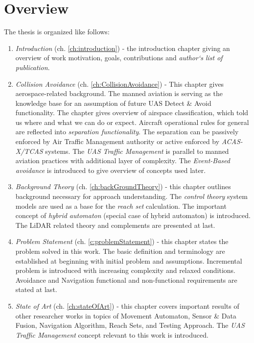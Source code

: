 \newpage
\section{ Overview}\label{s:Overview}

\noindent The thesis is organized like follows:

\begin{enumerate}
    \item \emph{Introduction} (ch. \ref{ch:introduction}) - the introduction chapter giving an overview of work motivation, goals, contributions and \emph{author`s list of publication}.
    
    \item \emph{Collision Avoidance} (ch. \ref{ch:CollisionAvoidance}) - This chapter gives aerospace-related background. The manned aviation is serving as the knowledge base for an assumption of future UAS Detect \& Avoid functionality. The chapter gives overview of airspace classification, which told us where and what we can do or expect. Aircraft operational rules for general are reflected into \emph{separation functionality}. The separation can be passively enforced by Air Traffic Management authority or active enforced by \emph{ACAS-X/TCAS} systems. The \emph{UAS Traffic Management} is parallel to manned aviation practices with additional layer of complexity.  The \emph{Event-Based avoidance} is introduced to give overview of concepts used later.
    
    \item \emph{Background Theory} (ch. \ref{ch:backGroundTheory}) - this chapter outlines background necessary for approach understanding. The \emph{control theory} system models are used as a base for the \emph{reach set} calculation. The important concept of \emph{hybrid automaton} (special case of hybrid automaton) is introduced. The LiDAR related theory and complements are presented at last. 
    
    \item \emph{Problem Statement} (ch. \ref{c:problemStatement}) - this chapter states the problem solved in this work. The basic definition and terminology are established at beginning with initial problem and assumptions. Incremental problem is introduced with increasing complexity and relaxed conditions. Avoidance and Navigation functional and non-functional requirements are stated at last. 
    
    \item \emph{State of Art} (ch. \ref{ch:stateOfArt}) - this chapter covers important results of other researcher works in topics of Movement Automaton, Sensor \& Data Fusion, Navigation Algorithm, Reach Sets, and Testing Approach. The \emph{UAS Traffic Management} concept relevant to this work is introduced.  
    

\end{enumerate}
